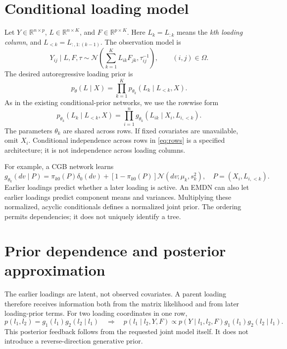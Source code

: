 \documentclass[11pt,a4paper]{article}
\newcommand{\N}{\mathcal N}
\begin{document}
\section{Conditional loading model}
Let \(Y\in\mathbb R^{n\times p}\), \(L\in\mathbb R^{n\times K}\), and
\(F\in\mathbb R^{p\times K}\). Here \(L_k=L_{:k}\) means the \emph{kth
loading column}, and \(L_{<k}=L_{:,1:(k-1)}\). The observation model is
\begin{equation}
Y_{ij}\mid L,F,\tau\sim
\N\!\left(\sum_{k=1}^KL_{ik}F_{jk},\tau_{ij}^{-1}\right),
\qquad (i,j)\in\Omega.
\label{eq:likelihood}
\end{equation}
The desired autoregressive loading prior is
\begin{equation}
\boxed{p_\theta(L\mid X)=\prod_{k=1}^Kp_{\theta_k}(L_k\mid L_{<k},X).}
\label{eq:desired}
\end{equation}
As in the existing conditional-prior networks, we use the rowwise form
\begin{equation}
p_{\theta_k}(L_k\mid L_{<k},X)
=\prod_{i=1}^ng_{\theta_k}(L_{ik}\mid X_i,L_{i,<k}).
\label{eq:rows}
\end{equation}
The parameters \(\theta_k\) are shared across rows. If fixed covariates are
unavailable, omit \(X_i\). Conditional independence across rows in
\eqref{eq:rows} is a specified architecture; it is not independence across
loading columns.

For example, a CGB network learns
\[
g_{\theta_k}(dv\mid P)=\pi_{k0}(P)\delta_0(dv)
+[1-\pi_{k0}(P)]\N(dv;\mu_k,s_k^2),\quad P=(X_i,L_{i,<k}).
\]
Earlier loadings predict whether a later loading is active. An EMDN can
also let earlier loadings predict component means and variances. Multiplying
these normalized, acyclic conditionals defines a normalized joint prior.
The ordering permits dependencies; it does not uniquely identify a tree.

\clearpage
\section{Prior dependence and posterior approximation}
The earlier loadings are latent, not observed covariates. A parent loading
therefore receives information both from the matrix likelihood and from
later loading-prior terms. For two loading coordinates in one row,
\[
p(l_1,l_2)=g_1(l_1)g_2(l_2\mid l_1)
\quad\Longrightarrow\quad
p(l_1\mid l_2,Y,F)\propto p(Y\mid l_1,l_2,F)g_1(l_1)g_2(l_2\mid l_1).
\]
This posterior feedback follows from the requested joint model itself.
It does not introduce a reverse-direction generative prior.
\end{document}

